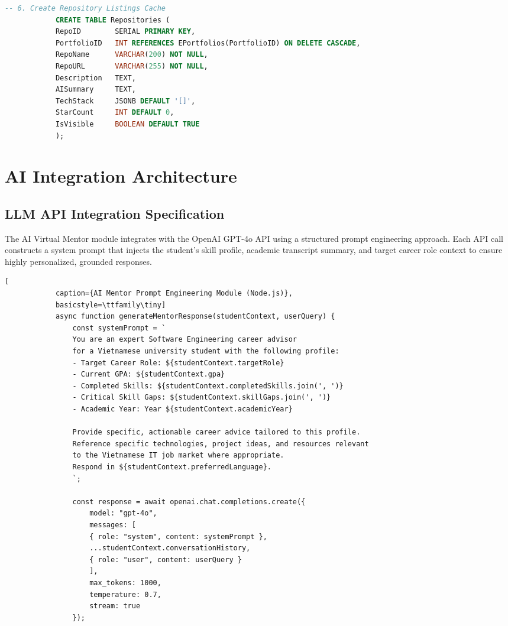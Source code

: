 \documentclass[12pt,a4paper]{report}
\begin{document}
\begin{spacing}{1.5}
\begin{lstlisting}[language=SQL, caption={Core Database Schema DDL --- PCOLRP PostgreSQL Implementation}]
			-- 6. Create Repository Listings Cache
			CREATE TABLE Repositories (
			RepoID        SERIAL PRIMARY KEY,
			PortfolioID   INT REFERENCES EPortfolios(PortfolioID) ON DELETE CASCADE,
			RepoName      VARCHAR(200) NOT NULL,
			RepoURL       VARCHAR(255) NOT NULL,
			Description   TEXT,
			AISummary     TEXT,
			TechStack     JSONB DEFAULT '[]',
			StarCount     INT DEFAULT 0,
			IsVisible     BOOLEAN DEFAULT TRUE
			);
		\end{lstlisting}
		
		\section{AI Integration Architecture}
		
		\subsection{LLM API Integration Specification}
		
		The AI Virtual Mentor module integrates with the OpenAI GPT-4o API using a structured prompt engineering approach. Each API call constructs a system prompt that injects the student's skill profile, academic transcript summary, and target career role context to ensure highly personalized, grounded responses.
		
		\begin{lstlisting}[
			caption={AI Mentor Prompt Engineering Module (Node.js)},
			basicstyle=\ttfamily\tiny]
			async function generateMentorResponse(studentContext, userQuery) {
				const systemPrompt = `
				You are an expert Software Engineering career advisor
				for a Vietnamese university student with the following profile:
				- Target Career Role: ${studentContext.targetRole}
				- Current GPA: ${studentContext.gpa}
				- Completed Skills: ${studentContext.completedSkills.join(', ')}
				- Critical Skill Gaps: ${studentContext.skillGaps.join(', ')}
				- Academic Year: Year ${studentContext.academicYear}
				
				Provide specific, actionable career advice tailored to this profile.
				Reference specific technologies, project ideas, and resources relevant
				to the Vietnamese IT job market where appropriate.
				Respond in ${studentContext.preferredLanguage}.
				`;
				
				const response = await openai.chat.completions.create({
					model: "gpt-4o",
					messages: [
					{ role: "system", content: systemPrompt },
					...studentContext.conversationHistory,
					{ role: "user", content: userQuery }
					],
					max_tokens: 1000,
					temperature: 0.7,
					stream: true
				});
				

\end{lstlisting}
\end{spacing}
\end{document}
